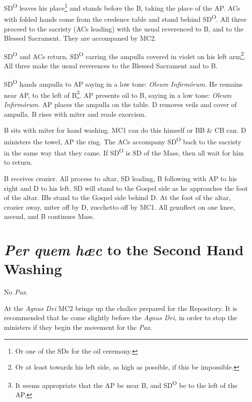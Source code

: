 \documentclass{report}
\begin{document}
\begin{multicols}{2}
    \rubric SD\textsuperscript{O} leaves his place\footnote{Or one of the SDs
    for the oil ceremony.} and stands before the B, taking the place of the AP.
    ACs with folded hands come from the credence table and stand behind
    SD\textsuperscript{O}. All three proceed to the sacristy (ACs leading) with
    the usual reverenced to B, and to the Blessed Sacrament. They are
    accompaned by MC2.

    \rubric SD\textsuperscript{O} and ACs return, SD\textsuperscript{O} carring
    the ampulla covered in violet on his left arm\footnote{Or at least towards
    his left side, as high as possible, if this be impossible.}. All three make
    the usual reverences to the Blessed Sacrament and to B.

    \rubric SD\textsuperscript{O} hands ampulla to AP saying in a low tone:
    \textit{Oleum Infirmórum.} He remains near AP, to the left of B\footnote{It
    seems appropriate that the AP be near B, and SD\textsuperscript{O} be to
    the left of the AP.}. AP presents oil to B, saying in a low tone:
    \textit{Oleum Infirmórum.} AP places the ampulla on the table. D removes
    veils and cover of ampulla. B rises with miter and reads exorcism.

    \rubric B sits with miter for hand washing. MC1 can do this himself or BB
    \& CB can. D ministers the towel, AP the ring. The ACs accompany
    SD\textsuperscript{O} back to the sacristy in the same way that they came.
    If SD\textsuperscript{O} is SD of the Mass, then all wait for him to
    return. 

    \rubric B receives crozier. All process to altar, SD leading, B following
    with AP to his right and D to his left. SD will stand to the Gospel side as
    he approaches the foot of the altar. IBs stand to the Gospel side behind D.
    At the foot of the altar, crozier away, miter off by D, zucchetto off by
    MC1. All genuflect on one knee, ascend, and B continues Mass.

    \section{\textit{Per quem hæc} to the Second Hand Washing}

    \rubric No \textit{Pax}.

    \rubric At the \textit{Agnus Dei} MC2 brings up the chalice prepared for
    the Repository. It is recommended that he come slightly before the
    \textit{Agnus Dei,} in order to stop the ministers if they begin the
    movement for the \textit{Pax.}


\end{multicols}
\end{document}
